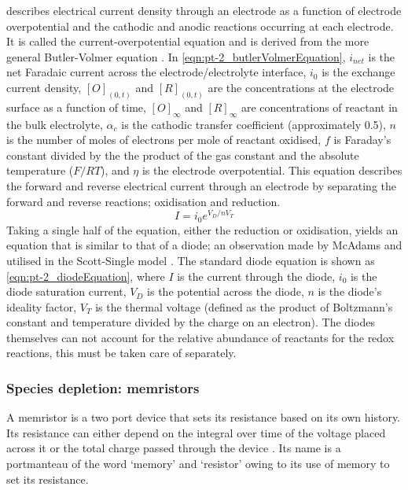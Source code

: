        describes electrical current density through an electrode as a function of electrode overpotential and the cathodic and anodic reactions occurring at each electrode.
      It is called the current-overpotential equation and is derived from the more general Butler-Volmer equation \cite{Merrill2005,ScottSingle2013}.
      In \cref{eqn:pt-2_butlerVolmerEquation}, $i_{net}$ is the net Faradaic current across the electrode/electrolyte interface,
      $i_{0}$ is the exchange current density,
      $[O]_{(0,t)}$ and $[R]_{(0,t)}$ are the concentrations at the electrode surface as a function of time,
      $[O]_{\infty}$ and $[R]_{\infty}$ are concentrations of reactant in the bulk electrolyte,
      $\alpha_{c}$ is the cathodic transfer coefficient (approximately 0.5),
      $n$ is the number of moles of electrons per mole of reactant oxidised,
      $f$ is Faraday's constant divided by the the product of the gas constant and the absolute temperature ($F/RT$),
      and $\eta$ is the electrode overpotential.
      This equation describes the forward and reverse electrical current through an electrode by separating the forward and reverse reactions; oxidisation and reduction.
      \begin{equation}
        I = i_0 e^{V_D / n V_T}
        \label{eqn:pt-2_diodeEquation}
      \end{equation}
      Taking a single half of the equation, either the reduction or oxidisation, yields an equation that is similar to that of a diode; an observation made by McAdams and utilised in the Scott-Single model \cite{McAdams1995}.
      The standard diode equation is shown as \cref{eqn:pt-2_diodeEquation}, where
      $I$ is the current through the diode,
      $i_0$ is the diode saturation current,
      $V_D$ is the potential across the diode,
      $n$ is the diode's ideality factor,
      $V_T$ is the thermal voltage (defined as the product of Boltzmann's constant and temperature divided by the charge on an electron).
      The diodes themselves can not account for the relative abundance of reactants for the redox reactions, this must be taken care of separately.

    \subsubsection{Species depletion: memristors}
      A memristor is a two port device that sets its resistance based on its own history.
      Its resistance can either depend on the integral over time of the voltage placed across it or the total charge passed through the device \cite{Kvatinsky2012}.
      Its name is a portmanteau of the word `memory' and `resistor' owing to its use of memory to set its resistance.

